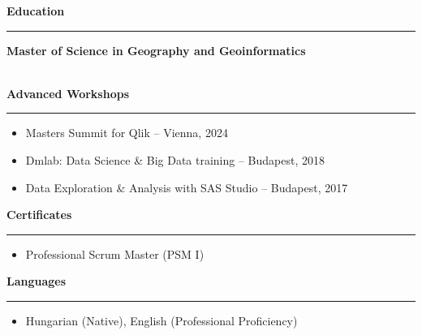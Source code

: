 \documentclass[a4paper,11pt]{article}
\renewcommand{\scriptsize}{\fontsize{9}{10}\selectfont}
\newcommand{\heading}[1]{\vspace{6pt}\textbf{\large #1}\vspace{2pt}\hrule\vspace{2pt}}
\newcommand{\subheading}[1]{\vspace{4pt} \textbf{#1}\vspace{2pt}}
\begin{document}
\heading{Education}
\subheading{Master of Science in Geography and Geoinformatics} \vspace{-4pt} \\
{\scriptsize {University of Debrecen}}\\
\vspace{-14pt}

\heading{Advanced Workshops}
\begin{itemize}[noitemsep, topsep=0pt]
    \item Masters Summit for Qlik -- Vienna, 2024
    \item Dmlab: Data Science \& Big Data training -- Budapest, 2018
    \item Data Exploration \& Analysis with SAS Studio -- Budapest, 2017
\end{itemize}

\heading{Certificates}
\begin{itemize}[noitemsep, topsep=0pt]
    \item Professional Scrum Master (PSM I)
\end{itemize}

\heading{Languages}
\begin{itemize}[noitemsep, topsep=0pt]
        \item Hungarian (Native), English (Professional Proficiency)
\end{itemize}
\end{document}
